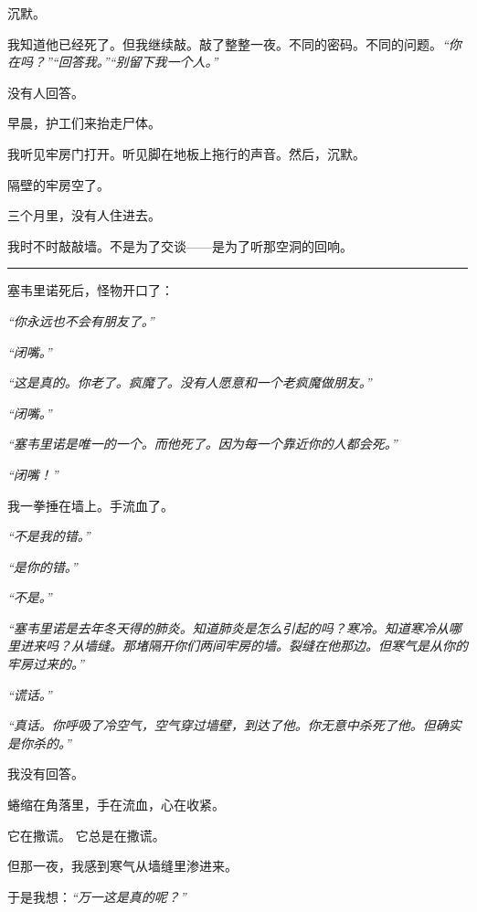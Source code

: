 \noindent 沉默。

\noindent 我知道他已经死了。但我继续敲。敲了整整一夜。不同的密码。不同的问题。\textit{“你在吗？”}\textit{“回答我。”}\textit{“别留下我一个人。”}

\noindent 没有人回答。

\noindent 早晨，护工们来抬走尸体。

\noindent 我听见牢房门打开。听见脚在地板上拖行的声音。然后，沉默。

\noindent 隔壁的牢房空了。

\noindent 三个月里，没有人住进去。

\noindent 我时不时敲敲墙。不是为了交谈——是为了听那空洞的回响。

\vspace{0.5em}\noindent\rule{\textwidth}{0.5pt}\vspace{0.5em}

\noindent 塞韦里诺死后，怪物开口了：

\noindent \textit{“你永远也不会有朋友了。”}

\noindent \textit{“闭嘴。”}

\noindent \textit{“这是真的。你老了。疯魔了。没有人愿意和一个老疯魔做朋友。”}

\noindent \textit{“闭嘴。”}

\noindent \textit{“塞韦里诺是唯一的一个。而他死了。因为每一个靠近你的人都会死。”}

\noindent \textit{“闭嘴！”}

\noindent 我一拳捶在墙上。手流血了。

\noindent \textit{“不是我的错。”}

\noindent \textit{“是你的错。”}

\noindent \textit{“不是。”}

\noindent \textit{“塞韦里诺是去年冬天得的肺炎。知道肺炎是怎么引起的吗？寒冷。知道寒冷从哪里进来吗？从墙缝。那堵隔开你们两间牢房的墙。裂缝在他那边。但寒气是从你的牢房过来的。”}

\noindent \textit{“谎话。”}

\noindent \textit{“真话。你呼吸了冷空气，空气穿过墙壁，到达了他。你无意中杀死了他。但确实是你杀的。”}

\noindent 我没有回答。

\noindent 蜷缩在角落里，手在流血，心在收紧。

\noindent 它在撒谎。
它总是在撒谎。

\noindent 但那一夜，我感到寒气从墙缝里渗进来。

\noindent 于是我想：\textit{“万一这是真的呢？”}

